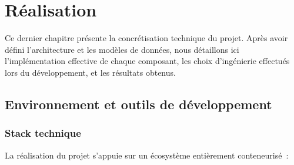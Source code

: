 \chapter{Réalisation}

Ce dernier chapitre présente la concrétisation technique du projet. Après avoir défini l'architecture et les modèles de données, nous détaillons ici l'implémentation effective de chaque composant, les choix d'ingénierie effectués lors du développement, et les résultats obtenus.

\section{Environnement et outils de développement}

\subsection{Stack technique}

La réalisation du projet s'appuie sur un écosystème entièrement conteneurisé~:


